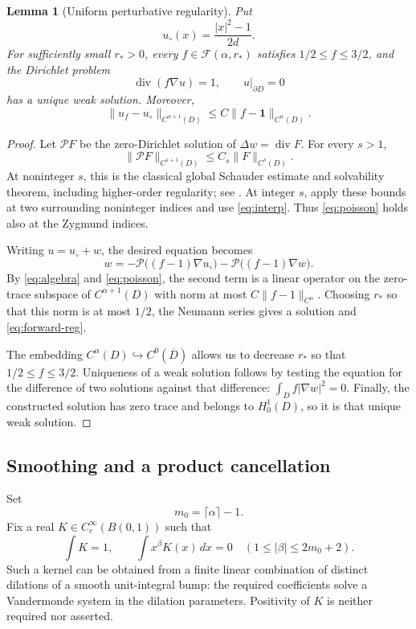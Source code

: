 \documentclass[11pt]{article}
\newtheorem{lemma}[theorem]{Lemma}
\theoremstyle{remark}
\newcommand{\one}{\mathbf 1}
\newcommand{\cF}{\mathcal F}
\DeclareMathOperator{\divergence}{div}
\begin{document}
\begin{lemma}[Uniform perturbative regularity]\label{lem:forward}
Put
\[
u_\circ(x)=\frac{|x|^2-1}{2d}.
\]
For sufficiently small \(r_*>0\), every
\(f\in\cF(\alpha,r_*)\) satisfies \(1/2\leq f\leq3/2\), and the
Dirichlet problem
\[
\divergence(f\nabla u)=1,\qquad u|_{\partial D}=0
\]
has a unique weak solution. Moreover,
\begin{equation}\label{eq:forward-reg}
\|u_f-u_\circ\|_{C^{\alpha+1}(D)}
\leq C\|f-\one\|_{C^\alpha(D)}.
\end{equation}
\end{lemma}

\begin{proof}
Let \(\mathcal P F\) be the zero-Dirichlet solution of
\(\Delta w=\divergence F\). For every \(s>1\),
\begin{equation}\label{eq:poisson}
\|\mathcal P F\|_{C^{s+1}(D)}
\leq C_s\|F\|_{C^s(D)}.
\end{equation}
At noninteger \(s\), this is the classical global Schauder estimate
and solvability theorem, including higher-order regularity; see
\cite[Theorems~6.6, 6.14 and 6.19]{GT}.
At integer \(s\), apply these bounds at two surrounding noninteger
indices and use \eqref{eq:interp}. Thus \eqref{eq:poisson} holds
also at the Zygmund indices.

Writing \(u=u_\circ+w\), the desired equation becomes
\[
w=-\mathcal P\big((f-1)\nabla u_\circ\big)
  -\mathcal P\big((f-1)\nabla w\big).
\]
By \eqref{eq:algebra} and \eqref{eq:poisson}, the second term is a
linear operator on the zero-trace subspace of \(C^{\alpha+1}(D)\)
with norm at most \(C\|f-1\|_{C^\alpha}\). Choosing \(r_*\) so that
this norm is at most \(1/2\), the Neumann series gives a solution
and \eqref{eq:forward-reg}.

The embedding \(C^\alpha(D)\hookrightarrow C^0(\overline D)\)
allows us to decrease \(r_*\) so that \(1/2\leq f\leq3/2\).
Uniqueness of a weak solution follows by testing the equation for
the difference of two solutions against that difference:
\(\int_D f|\nabla w|^2=0\). Finally, the constructed solution has
zero trace and belongs to \(H^1_0(D)\), so it is that unique weak
solution.
\end{proof}

\subsection{Smoothing and a product cancellation}

Set
\[
m_0=\lceil\alpha\rceil-1.
\]
Fix a real \(K\in C^\infty_c(B(0,1))\) such that
\begin{equation}\label{eq:kernel}
\int K=1,\qquad
\int x^\beta K(x)\,dx=0
\quad(1\leq|\beta|\leq2m_0+2).
\end{equation}
Such a kernel can be obtained from a finite linear combination of
distinct dilations of a smooth unit-integral bump: the required
coefficients solve a Vandermonde system in the dilation parameters.
Positivity of \(K\) is neither required nor asserted.
\end{document}
